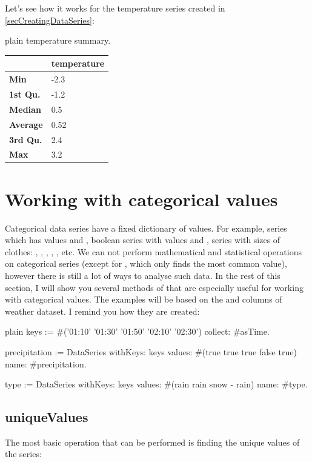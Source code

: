 \documentclass[10pt,twoside,english]{_support/latex/sbabook/sbabook}
\begin{document}
Let's see how it works for the temperature series created in \ref{secCreatingDataSeries}:

\begin{displaycode}{plain}
temperature summary.
\end{displaycode}

\begin{tabular}{ll}
\toprule
 & \textbf{temperature} \\
\midrule
\textbf{Min} & -2.3 \\
\textbf{1st Qu.} & -1.2 \\
\textbf{Median} & 0.5 \\
\textbf{Average} & 0.52 \\
\textbf{3rd Qu.} & 2.4 \\
\textbf{Max} & 3.2 \\
\bottomrule
\end{tabular}
\section{Working with categorical values}
Categorical data series have a fixed dictionary of values. For example, series  which has values  and , boolean series with values  and , series with sizes of clothes: , , , , , etc. We can not perform mathematical and statistical operations on categorical series (except for , which only finds the most common value), however there is still a lot of ways to analyse such data. In the rest of this section, I will show you several methods of  that are especially useful for working with categorical values. The examples will be based on the  and  columns of weather dataset. I remind you how they are created:

\begin{displaycode}{plain}
keys := #('01:10' '01:30' '01:50' '02:10' '02:30') collect: #asTime.

precipitation := DataSeries
  withKeys: keys
  values: #(true true true false true)
  name: #precipitation.

type := DataSeries
  withKeys: keys
  values: #(rain rain snow - rain)
  name: #type.
\end{displaycode}
\subsection{uniqueValues}
The most basic operation that can be performed is finding the unique values of the series:
\end{document}
